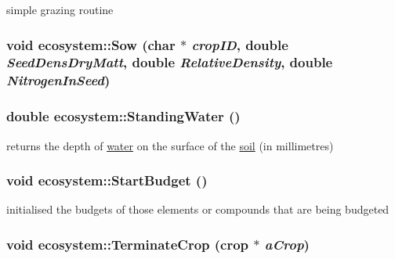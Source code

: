 simple grazing routine \hypertarget{classecosystem_ac50dd34f13319a8e97c7009b11d19a5d}{
\subsubsection[{Sow}]{\setlength{\rightskip}{0pt plus 5cm}void ecosystem::Sow (char $\ast$ {\em cropID}, \/  double {\em SeedDensDryMatt}, \/  double {\em RelativeDensity}, \/  double {\em NitrogenInSeed})}}
\label{classecosystem_ac50dd34f13319a8e97c7009b11d19a5d}
\hypertarget{classecosystem_a423bd890e368dff9c00300691212d79e}{
\subsubsection[{StandingWater}]{\setlength{\rightskip}{0pt plus 5cm}double ecosystem::StandingWater ()}}
\label{classecosystem_a423bd890e368dff9c00300691212d79e}


returns the depth of \hyperlink{classwater}{water} on the surface of the \hyperlink{classsoil}{soil} (in millimetres) \hypertarget{classecosystem_adf56761a03f7ca49ee67b0dfc79d032e}{
\subsubsection[{StartBudget}]{\setlength{\rightskip}{0pt plus 5cm}void ecosystem::StartBudget ()}}
\label{classecosystem_adf56761a03f7ca49ee67b0dfc79d032e}


initialised the budgets of those elements or compounds that are being budgeted \hypertarget{classecosystem_a34442a209e38774eead5221826c31a61}{
\subsubsection[{TerminateCrop}]{\setlength{\rightskip}{0pt plus 5cm}void ecosystem::TerminateCrop ({\bf crop} $\ast$ {\em aCrop})}}
\label{classecosystem_a34442a209e38774eead5221826c31a61}


